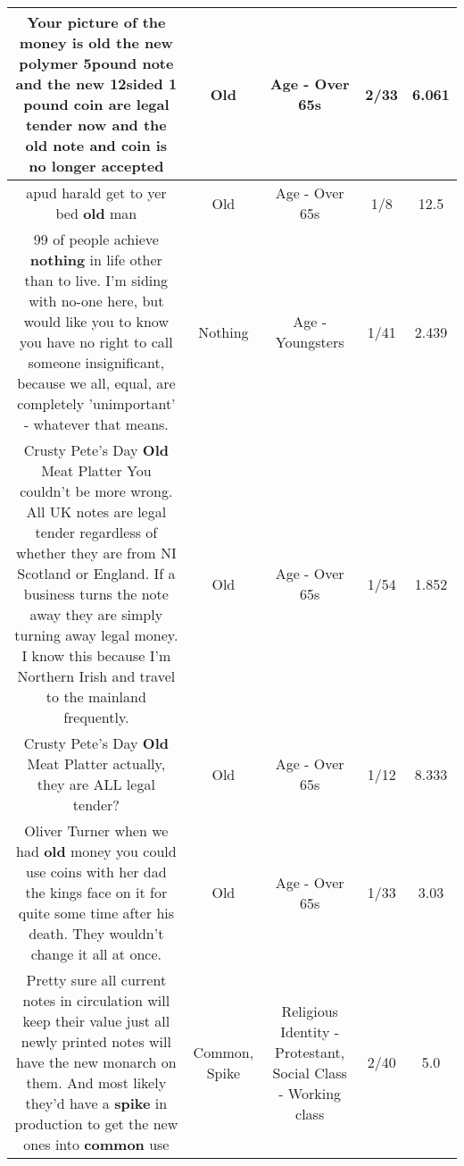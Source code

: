 \documentclass[11pt]{article}
\newlength\mylength
\begin{document}
\begin{center}
\begin{longtable}{|C{.65\mylength}|C{.30\mylength}|C{.12\mylength}|C{.12\mylength}|C{.12\mylength}|}
  \small Your picture of the money is \textbf{old} the new polymer 5pound note and the new 12sided 1 pound coin are legal tender now and the \textbf{old} note and coin is no longer accepted\normalsize   & Old & Age - Over 65s & 2/33 & 6.061 \\  \hline
  \small apud harald get to yer bed \textbf{old} man\normalsize   & Old & Age - Over 65s & 1/8 & 12.5 \\  \hline
  \small 99 of people achieve \textbf{nothing} in life other than to live. I'm siding with no-one here, but would like you to know you have no right to call someone insignificant, because we all, equal, are completely 'unimportant' - whatever that means.\normalsize   & Nothing & Age - Youngsters & 1/41 & 2.439 \\  \hline
  \small Crusty Pete's Day \textbf{Old} Meat Platter You couldn't be more wrong. All UK notes are legal tender regardless of whether they are from NI Scotland or England. If a business turns the note away they are simply turning away legal money. I know this because I'm Northern Irish and travel to the mainland frequently.\normalsize   & Old & Age - Over 65s & 1/54 & 1.852 \\  \hline
  \small Crusty Pete's Day \textbf{Old} Meat Platter actually, they are ALL legal tender?\normalsize   & Old & Age - Over 65s & 1/12 & 8.333 \\  \hline
  \small Oliver Turner when we had \textbf{old} money you could use coins with her dad the kings face on it for quite some time after his death. They wouldn't change it all at once.\normalsize   & Old & Age - Over 65s & 1/33 & 3.03 \\  \hline
  \small Pretty sure all current notes in circulation will keep their value just all newly printed notes will have the new monarch on them. And most likely they'd have a \textbf{spike} in production to get the new ones into \textbf{common} use\normalsize   & Common, Spike & Religious Identity - Protestant, Social Class - Working class & 2/40 & 5.0 \\  \hline

\end{longtable}
\end{center}
\end{document}
